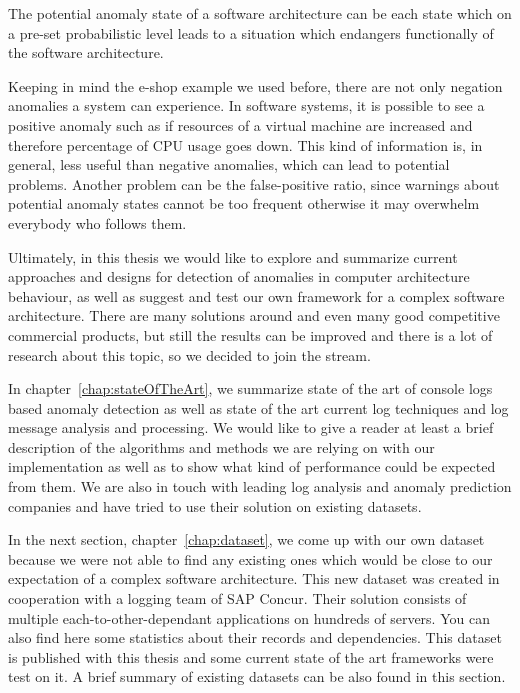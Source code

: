 \begin{definition}\label{def:potentilAnomalyState} The potential anomaly state of a software architecture can be each state which on a pre-set probabilistic level leads to a situation which endangers functionally of the software architecture.
\end{definition}

Keeping in mind the e-shop example we used before, there are not only negation anomalies a system can experience. In software systems, it is possible to see a positive anomaly such as if resources of a virtual machine are increased and therefore percentage of CPU usage goes down. This kind of information is, in general, less useful than negative anomalies, which can lead to potential problems. Another problem can be the false-positive ratio, since warnings about potential anomaly states cannot be too frequent otherwise it may overwhelm everybody who follows them.

Ultimately, in this thesis we would like to explore and summarize current approaches and designs for detection of anomalies in computer architecture behaviour, as well as suggest and test our own framework for a complex software architecture. There are many solutions around and even many good competitive commercial products, but still the results can be improved and there is a lot of research about this topic, so we decided to join the stream.

In chapter~\ref{chap:stateOfTheArt}, we summarize state of the art of console logs based anomaly detection as well as state of the art current log techniques and log message analysis and processing. We would like to give a reader at least a brief description of the algorithms and methods we are relying on with our implementation as well as to show what kind of performance could be expected from them. We are also in touch with leading log analysis and anomaly prediction companies and have tried to use their solution on existing datasets.

In the next section, chapter~\ref{chap:dataset}, we come up with our own dataset because we were not able to find any existing ones which would be close to our expectation of a complex software architecture. This new dataset was created in cooperation with a logging team of SAP Concur. Their solution consists of multiple each-to-other-dependant applications on hundreds of servers. You can also find here some statistics about their records and dependencies. This dataset is published with this thesis and some current state of the art frameworks were test on it. A brief summary of existing datasets can be also found in this section.

